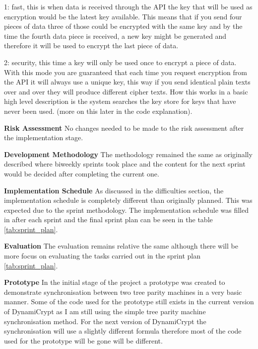 1: fast, this is when data is received through the API the key that will be used as encryption would be the latest key available. This means that if you send four pieces of data three of those could be encrypted with the same key and by the time the fourth data piece is received, a new key might be generated and therefore it will be used to encrypt the last piece of data.

2: security, this time a key will only be used once to encrypt a piece of data. With this mode you are guaranteed that each time you request encryption from the API it will always use a unique key, this way if you send identical plain texts over and over they will produce different cipher texts. How this works in a basic high level description is the system searches the key store for keys that have never been used. (more on this later in the code explanation).

\textbf{Risk Assessment}
No changes needed to be made to the risk assessment after the implementation stage.

\textbf{Development Methodology}
The methodology remained the same as originally described where biweekly sprints took place and the content for the next sprint would be decided after completing the current one. 

\textbf{Implementation Schedule}
As discussed in the difficulties section, the implementation schedule is completely different than originally planned. This was expected due to the sprint methodology. The implementation schedule was filled in after each sprint and the final sprint plan can be seen in the table \ref{tab:sprint_plan}. 

\textbf{Evaluation}
The evaluation remains relative the same although there will be more focus on evaluating the tasks carried out in the sprint plan \ref{tab:sprint_plan}. 

\textbf{Prototype}
In the initial stage of the project a prototype was created to demonstrate synchronisation between two tree parity machines in a very basic manner. Some of the code used for the prototype still exists in the current version of DynamiCrypt as I am still using the simple tree parity machine synchronisation method. For the next version of DynamiCrypt the synchronisation will use a slightly different formula therefore most of the code used for the prototype will be gone will be different. 